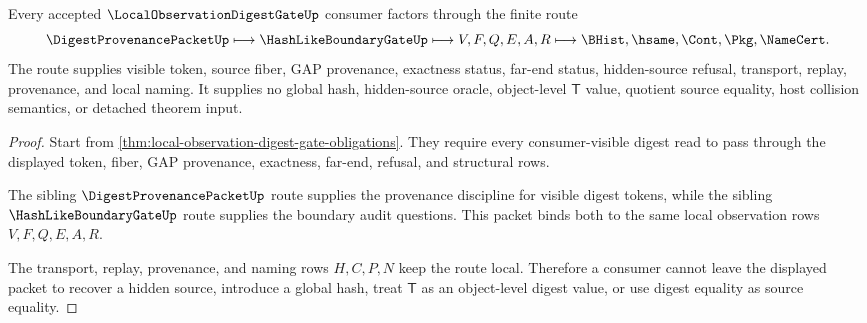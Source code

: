 \begin{theorem}
\label{thm:local-observation-digest-gate-boundary-nonescape}
Every accepted $\LocalObservationDigestGateUp$ consumer factors through the finite route
$$
\DigestProvenancePacketUp
\longmapsto
\HashLikeBoundaryGateUp
\longmapsto
V,F,Q,E,A,R
\longmapsto
\BHist,\hsame,\Cont,\Pkg,\NameCert .
$$
The route supplies visible token, source fiber, GAP provenance, exactness status, far-end status, hidden-source refusal, transport, replay, provenance, and local naming. It supplies no global hash, hidden-source oracle, object-level $\mathsf{T}$ value, quotient source equality, host collision semantics, or detached theorem input.
\end{theorem}
\begin{proof}
Start from \autoref{thm:local-observation-digest-gate-obligations}. They require every consumer-visible digest read to pass through the displayed token, fiber, GAP provenance, exactness, far-end, refusal, and structural rows.

The sibling $\DigestProvenancePacketUp$ route supplies the provenance discipline for visible digest tokens, while the sibling $\HashLikeBoundaryGateUp$ route supplies the boundary audit questions. This packet binds both to the same local observation rows $V,F,Q,E,A,R$.

The transport, replay, provenance, and naming rows $H,C,P,N$ keep the route local. Therefore a consumer cannot leave the displayed packet to recover a hidden source, introduce a global hash, treat $\mathsf{T}$ as an object-level digest value, or use digest equality as source equality.
\end{proof}




